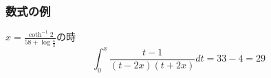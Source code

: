 \begin{frame}
    \frametitle{数式の例}

    $x=\frac{\coth^{-1}2}{58+\log\frac{4}{3} }$の時
    \begin{equation}
        \int_{0}^{x}\frac{t-1}{\left( t-2x \right)\left( t+2x \right)}dt=33-4=29
    \end{equation}

\end{frame}
